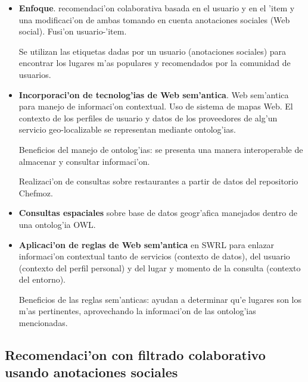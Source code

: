 \documentclass[11pt]{article}
\begin{document}
\begin{itemize}
\item \textbf{Enfoque}. recomendaci'on colaborativa basada en el usuario y en el 'item y una modificaci'on de ambas tomando en cuenta anotaciones sociales (Web social). Fusi'on usuario-'item.

 Se utilizan las etiquetas dadas por un usuario (anotaciones sociales) para encontrar los lugares m'as populares y recomendados por la comunidad de usuarios.
\item \textbf{Incorporaci'on de tecnolog'ias de Web sem'antica}. Web sem'antica para manejo de informaci'on contextual. Uso de sistema de mapas Web. El contexto de los perfiles de usuario y datos de los proveedores de alg'un servicio geo-localizable se representan mediante ontolog'ias.

Beneficios del manejo de ontolog'ias: se presenta una manera interoperable de almacenar y consultar informaci'on.

Realizaci'on de consultas sobre restaurantes a partir de datos del repositorio Chefmoz.
\item \textbf{Consultas espaciales} sobre base de datos geogr'afica manejados dentro de una ontolog'ia OWL.
\item \textbf{Aplicaci'on de reglas de Web sem'antica} en SWRL para enlazar informaci'on contextual tanto de servicios (contexto de datos), del usuario (contexto del perfil personal) y del lugar y momento de la consulta (contexto del entorno).

Beneficios de las reglas sem'anticas: ayudan a determinar qu'e lugares son los m'as pertinentes, aprovechando la informaci'on de las ontolog'ias mencionadas.
\end{itemize}


\subsection{Recomendaci'on con filtrado colaborativo usando anotaciones sociales}
\end{document}
